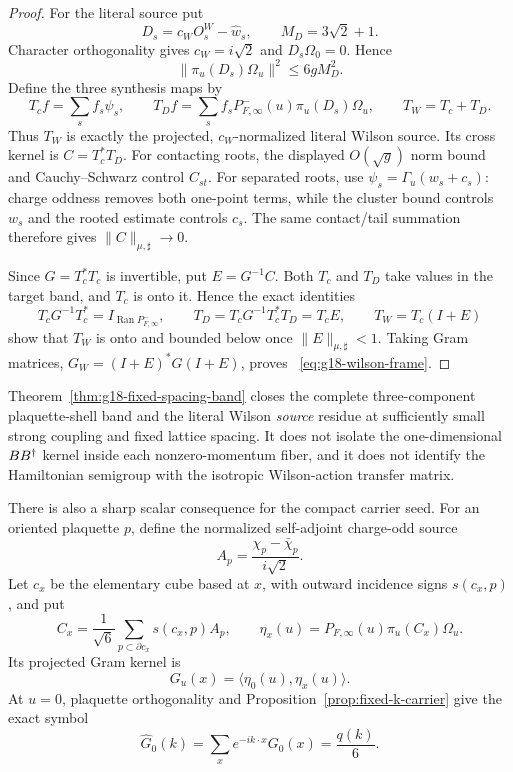 \begin{proof}
For the literal source put
\[
 D_s=c_WO_s^W-\widehat w_s,\qquad
 M_D=3\sqrt2+1.
\]
Character orthogonality gives $c_W=i\sqrt2$ and
$D_s\Omega_0=0$.  Hence
\[
 \|\pi_u(D_s)\Omega_u\|^2
 \le6gM_D^2 .
\]
Define the three synthesis maps by
\[
 T_cf=\sum_s f_s\psi_s,
 \qquad
 T_Df=\sum_s f_sP_{F,\infty}^-(u)\pi_u(D_s)\Omega_u,
 \qquad T_W=T_c+T_D .
\]
Thus $T_W$ is exactly the projected, $c_W$-normalized literal Wilson source.
Its cross kernel is $C=T_c^*T_D$.  For contacting roots, the displayed
$O(\sqrt g)$ norm bound and Cauchy--Schwarz control $C_{st}$.  For separated
roots, use $\psi_s=\Gamma_u(w_s+c_s)$: charge oddness removes both one-point
terms, while the cluster bound controls $w_s$ and the rooted estimate controls
$c_s$.  The same contact/tail summation therefore gives
$\|C\|_{\mu,\sharp}\to0$.

Since $G=T_c^*T_c$ is invertible, put $E=G^{-1}C$.  Both $T_c$ and $T_D$ take
values in the target band, and $T_c$ is onto it.  Hence the exact identities
\[
 T_cG^{-1}T_c^*=I_{\operatorname{Ran}P_{F,\infty}^-},
 \qquad
 T_D=T_cG^{-1}T_c^*T_D=T_cE,
 \qquad
 T_W=T_c(I+E)
\]
show that $T_W$ is onto and bounded below once
$\|E\|_{\mu,\sharp}<1$.  Taking Gram matrices,
$G_W=(I+E)^*G(I+E)$, proves
~\eqref{eq:g18-wilson-frame}.
\end{proof}

\begin{remark}
Theorem~\ref{thm:g18-fixed-spacing-band} closes the complete
three-component plaquette-shell band and the literal Wilson
\emph{source} residue at sufficiently small strong coupling and fixed
lattice spacing.  It does not isolate the one-dimensional $BB^{\dagger}$ kernel
inside each nonzero-momentum fiber, and it does not identify the Hamiltonian
semigroup with the isotropic Wilson-action transfer matrix.
\end{remark}

There is also a sharp scalar consequence for the compact carrier seed.  For an
oriented plaquette $p$, define the normalized self-adjoint charge-odd source
\[
 A_p=\frac{\chi_p-\bar\chi_p}{i\sqrt2}.
\]
Let $c_x$ be the elementary cube based at $x$, with outward incidence signs
$s(c_x,p)$, and put
\begin{equation}
 C_x=\frac1{\sqrt6}\sum_{p\subset\partial c_x}s(c_x,p)A_p,
 \qquad
 \eta_x(u)=P_{F,\infty}(u)\pi_u(C_x)\Omega_u .
 \label{eq:g18-cube-source}
\end{equation}
Its projected Gram kernel is
\begin{equation}
 G_u(x)=\langle\eta_0(u),\eta_x(u)\rangle .
 \label{eq:g18-gram-kernel}
\end{equation}
At $u=0$, plaquette orthogonality and
Proposition~\ref{prop:fixed-k-carrier} give the exact symbol
\begin{equation}
 \widehat G_0(k)=\sum_xe^{-ik\cdot x}G_0(x)=\frac{q(k)}6 .
 \label{eq:g18-free-gram}
\end{equation}


